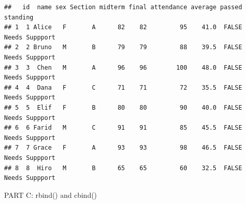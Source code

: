 \documentclass[
]{article}
\newenvironment{Shaded}{\begin{snugshade}}{\end{snugshade}}
\newcommand{\CommentTok}[1]{\textcolor[rgb]{0.56,0.35,0.01}{\textit{#1}}}
\newcommand{\DecValTok}[1]{\textcolor[rgb]{0.00,0.00,0.81}{#1}}
\newcommand{\FunctionTok}[1]{\textcolor[rgb]{0.13,0.29,0.53}{\textbf{#1}}}
\newcommand{\NormalTok}[1]{#1}
\newcommand{\OtherTok}[1]{\textcolor[rgb]{0.56,0.35,0.01}{#1}}
\newcommand{\SpecialCharTok}[1]{\textcolor[rgb]{0.81,0.36,0.00}{\textbf{#1}}}
\newcommand{\StringTok}[1]{\textcolor[rgb]{0.31,0.60,0.02}{#1}}
\begin{document}
\begin{Shaded}
\end{Shaded}

\begin{verbatim}
##   id  name sex Section midterm final attendance average passed       standing
## 1  1 Alice   F       A      82    82         95    41.0  FALSE Needs Suppport
## 2  2 Bruno   M       B      79    79         88    39.5  FALSE Needs Suppport
## 3  3  Chen   M       A      96    96        100    48.0  FALSE Needs Suppport
## 4  4  Dana   F       C      71    71         72    35.5  FALSE Needs Suppport
## 5  5  Elif   F       B      80    80         90    40.0  FALSE Needs Suppport
## 6  6 Farid   M       C      91    91         85    45.5  FALSE Needs Suppport
## 7  7 Grace   F       A      93    93         98    46.5  FALSE Needs Suppport
## 8  8  Hiro   M       B      65    65         60    32.5  FALSE Needs Suppport
\end{verbatim}

PART C: rbind() and cbind()
\end{document}
